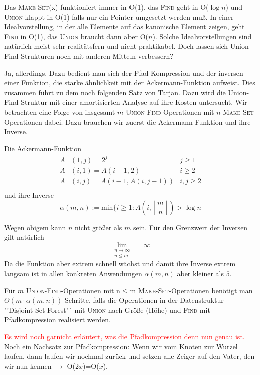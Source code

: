 Das \textsc{Make-Set}(x) funktioniert immer in O(1), das \textsc{Find} geht in O($\log n$) und \textsc{Union} klappt in
O(1) falls nur ein Pointer umgesetzt werden muß. In einer Idealvorstellung, in der alle Elemente auf das kanonische
Element zeigen, geht \textsc{Find} in O(1), das \textsc{Union} braucht dann aber O($n$). Solche Idealvorstellungen sind
natürlich meist sehr realitätsfern und nicht praktikabel. Doch lassen sich Union-Find-Strukturen noch mit anderen
Mitteln verbessern?

Ja, allerdings. Dazu bedient man sich der Pfad-Kompression und der inversen einer Funktion, die starke ähnlichkeit mit
der Ackermann-Funktion aufweist. Dies zusammen führt zu dem noch folgenden Satz von Tarjan. Dazu wird die
Union-Find-Struktur mit einer amortisierten Analyse auf ihre Kosten untersucht. Wir betrachten eine Folge von insgesamt 
$m$ \textsc{Union-Find}-Operationen mit $n$ \textsc{Make-Set}-Operationen dabei. Dazu brauchen wir zuerst die
Ackermann-Funktion und ihre Inverse.
\begin{definition}
 Die Ackermann-Funktion
 \begin{align*}
 A&(1,j)=2^j   & j\geq 1\\
 A&(i,1)=A(i-1,2)   & i\geq 2\\
 A&(i,j)=A(i-1, A(i,j-1))   & i,j \geq 2\\
 \end{align*}
 und ihre Inverse
 \[\alpha(m,n):=\mbox{min}\{i \geq 1 : A\left(i,\left\lfloor\frac{m}{n}\right\rfloor\right)> \log n\]
\end{definition}
Wegen obigem kann $n$ nicht größer als $m$ sein. Für den Grenzwert der Inversen gilt natürlich
\[\lim_{\substack{n \rightarrow \infty \\n \leq m }}=\infty\]
Da die Funktion aber extrem schnell wächst und damit ihre Inverse extrem langsam ist in allen konkreten Anwendungen 
$\alpha (m,n)$ aber kleiner als $5$. 

\begin{satz}
Für $m$ \textsc{Union-Find}-Operationen mit n$\leq$m \textsc{Make-Set}-Operationen benötigt man $\Theta( m \cdot
\alpha(m,n))$ Schritte, falls die Operationen in der Datenstruktur "'Disjoint-Set-Forest"` mit \textsc{Union} nach
Größe (Höhe) und \textsc{Find} mit Pfadkompression realisiert werden.
\end{satz}
\textcolor{red}{Es wird noch garnicht erläutert, was die Pfadkompression denn nun genau ist.}
Noch ein Nachsatz zur Pfadkompression: Wenn wir vom Knoten zur Wurzel laufen, dann laufen wir nochmal zurück und setzen
alle Zeiger auf den Vater, den wir nun kennen $\rightarrow$ O(2$x$)=O($x$).

